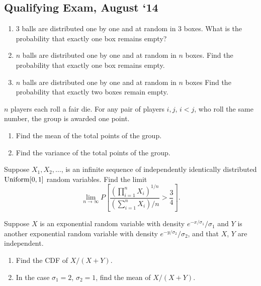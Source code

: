 \subsection{Qualifying Exam, August `14}
\begin{problem}
  \hfill
  \begin{enumerate}[label=(\alph*),noitemsep]
  \item \(3\) balls are distributed one by one and at random in \(3\)
    boxes. What is the probability that exactly one box remains empty?
  \item \(n\) balls are distributed one by one and at random in \(n\)
    boxes. Find the probability that exactly one box remains empty.
  \item \(n\) balls are distributed one by one and at random in \(n\)
    boxes Find the probability that exactly two boxes remain empty.
  \end{enumerate}
\end{problem}
\begin{solution*}
\end{solution*}

\begin{problem}
  \(n\) players each roll a fair die. For any pair of players \(i,j\),
  \(i<j\), who roll the same number, the group is awarded one point.
  \begin{enumerate}[label=(\alph*),noitemsep]
  \item Find the mean of the total points of the group.
  \item Find the variance of the total points of the group.
  \end{enumerate}
\end{problem}
\begin{solution*}
\end{solution*}

\begin{problem}
  Suppose \(X_1,X_2,\dotsc\), is an infinite sequence of independently
  identically distributed \(\operatorname{Uniform}[0,1]\) random variables. Find the
  limit
  \[
    \lim_{n\to\infty} P%
    \left[%
      \frac{\left(\prod_{i=1}^n X_i\right)^{1/n}}
      {\left(\sum_{i=1}^nX_i\right)/n}>\frac{3}{4}%
    \right].
  \]
\end{problem}
\begin{solution*}
\end{solution*}

\begin{problem}
  Suppose \(X\) is an exponential random variable with density
  \(e^{-x/\sigma_1}/\sigma_1\) and \(Y\) is another exponential random
  variable with density \(e^{-y/\sigma_2}/\sigma_2\), and that \(X\), \(Y\)
  are independent.
  \begin{enumerate}[label=(\alph*),noitemsep]
  \item Find the CDF of \(X/(X+Y)\).
  \item In the case \(\sigma_1=2\), \(\sigma_2=1\), find the mean of
    \(X/(X+Y)\).
  \end{enumerate}
\end{problem}
\begin{solution*}
\end{solution*}

